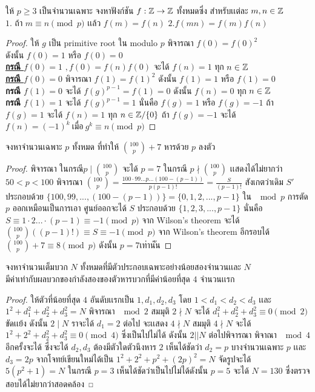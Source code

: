 \documentclass[a4paper,12pt]{scrartcl}
\begin{document}
	\begin{example}
			ให้ $p \ge 3$ เป็นจำนวนเฉพาะ จงหาฟังก์ชัน $f: \mathbb Z \rightarrow \mathbb Z$ ทั้งหมดซึ่ง สำหรับเเต่ละ $m,n \in \mathbb Z$\\ $1.$ ถ้า $m \equiv n \pmod p$ เเล้ว $f(m) = f(n)$ 
			\: $2. f(mn) = f(m)f(n)$ 
	\end{example}
\begin{proof}
	ให้ $g$ เป็น primitive root ใน modulo $p$ พิจารณา $f(0)=f(0)^2$ 
	\\ดังนั้น $f(0) = 1$ หรือ $f(0)=0$ \\
	\underline{\textbf{กรณี $f(0)=1$}} $, f(0)=f(n)f(0)$ จะได้ $f(n)=1$ ทุก $n \in \mathbb Z$ \\
	\underline{\textbf{กรณี $f(0) =0$}} พิจารณา $f(1)=f(1)^2$ 	ดังนั้น $f(1) = 1$ หรือ $f(1)=0$\\	
	\textbf{กรณี $f(1) = 0$} จะได้ $f(g)^{p-1} = f(1) = 0 $ ดังนั้น $f(n)=0$ ทุก $n \in \mathbb Z$ \\
	\textbf{กรณี $f(1) =1$} จะได้ $f(g)^{p-1} = 1$ นั่นคือ $f(g) = 1$ หรือ $f(g)=-1$ ถ้า $f(g)=1$ จะได้ $f(n) = 1$ ทุก $n \in \mathbb Z/\{0\}$ ถ้า $f(g) = -1$ จะได้ $f(n) = (-1)^k \: \text{เมื่อ} \: g^k \equiv n \pmod p$
	
\end{proof}
	\begin{example}
		จงหาจำนวนเฉพาะ $p$ ทั้งหมด ที่ทำให้ ${100 \choose p} + 7$ หารด้วย $p$ ลงตัว
	\end{example} 
	\begin{proof}
		พิจารณา ในกรณี$ p \mid {100 \choose p}$ จะได้ $p=7$ ในกรณี $p\nmid {100 \choose p}$ เเสดงได้ไม่ยากว่า $50<p < 100$  พิจารณา ${100 \choose p} =  \frac{100\cdot99 \dots p \dots  (100-(p-1)) }{p(p-1)!} = \frac{S}{(p-1)!}$ สังเกตว่าเดิม $S'$ ประกอบด้วย $\{100,99,..., (100-(p-1)) \} = \{0,1,2,...,p-1\}$ ใน $\mod p$ การตัด $p$ ออกเหมือนเป็นการเอา ศูนย์ออกจะได้ $S$ ประกอบด้วย $\{1,2,3,...,p-1\}$ นั่นคือ $S \equiv 1\cdot2...\cdot(p-1) \equiv -1 \pmod p$ จาก Wilson's theorem จะได้ ${100 \choose p}((p-1)!) \equiv S \equiv -1 \pmod p$ จาก Wilson's theorem อีกรอบได้ ${100 \choose p}+7 \equiv 8 \pmod p$ ดังนั้น $p=7 เท่านั้น$
	\end{proof}
	\begin{example}
		จงหาจำนวนเต็มบวก $N$ ทั้งหมดที่มีตัวประกอบเฉพาะอย่างน้อยสองจำนวนเเละ $N$\\ มีค่าเท่ากับผลบวกของกำลังสองของตัวหารบวกที่มีค่าน้อยที่สุด $4$ จำนวนเเรก
	\end{example}
	\begin{proof}
		ให้ตัวที่น้อยที่สุด $4$ อันดับเเรกเป็น $1,d_1,d_2,d_3$ โดย $1<d_1<d_2<d_3$ เเละ $1^2+ d_1^2+d_2^2+d_3^2 = N$ พิจารณา $\mod 2$ สมมุติ $2 \nmid N$ จะได้ $d_1^2+d_2^2+d_3^2 \equiv 0 \pmod 2 $ ขัดเเย้ง ดังนั้น $2\mid N$ ราจะได้ $d_1 = 2$ ต่อไป จะเเสดง $4 \nmid N $ สมมุติ $4 \nmid N$ จะได้ $1^2+2^2+d_2^2+d_3^2 \equiv 0 \pmod 4$  ซึ่งเป็นไปไม่ได้  ดังนั้น $2||N$ ต่อไปพิจารณา พิจาณา $\mod 4$ อีกครั้งจะได้ ซึ่งจะได้ $d_2,d_3$ ต้องมีตัวใดตัวนึงหาร $2$ เห็นได้ชัดว่า $d_2 = p$ บางจำนวนเฉพาะ $p$ เเละ $d_3 = 2p$ จากโจทย์เขียนใหม่ได้เป็น $1^2+2^2+p^2+(2p)^2 = N$ จัดรูปจะได้ $5(p^2+1) = N$ ในกรณี $p=3 $ เห็นได้ชัดว่าเป็นไปไม่ได้ดังนั้น $p = 5$ จะได้ $N=130$ ซึ่งตรวจสอบได้ไม่ยากว่าสอดคล้อง
	\end{proof}
\end{document}
